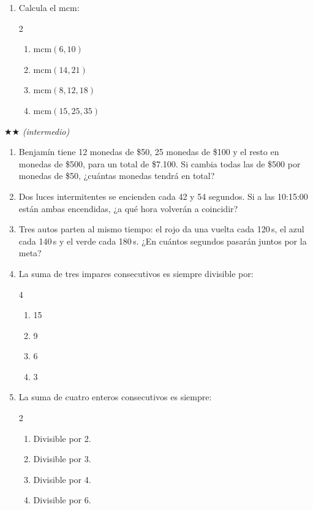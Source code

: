 \documentclass[11pt, letterpaper]{article}
\begin{document}
\begin{enumerate}[label=\textbf{\arabic*.}, leftmargin=*]
  \item Calcula el mcm:
  \begin{multicols}{2}
  \begin{enumerate}[label=\alph*)]
    \item $\text{mcm}(6,10)$
    \item $\text{mcm}(14,21)$
    \item $\text{mcm}(8,12,18)$
    \item $\text{mcm}(15,25,35)$
  \end{enumerate}
  \end{multicols}
\end{enumerate}

$\bigstar\bigstar$ \textit{(intermedio)}

\begin{enumerate}[label=\textbf{\arabic*.}, leftmargin=*, resume]
  \item Benjam\'in tiene 12 monedas de \$50, 25 monedas de \$100 y el resto en monedas de \$500, para un total de \$7.100. Si cambia todas las de \$500 por monedas de \$50, ¿cu\'antas monedas tendr\'a en total?

  \item Dos luces intermitentes se encienden cada 42 y 54 segundos. Si a las 10:15:00 est\'an ambas encendidas, ¿a qu\'e hora volver\'an a coincidir?

  \item Tres autos parten al mismo tiempo: el rojo da una vuelta cada 120\,s, el azul cada 140\,s y el verde cada 180\,s. ¿En cu\'antos segundos pasar\'an juntos por la meta?

  \item La suma de tres impares consecutivos es siempre divisible por:
  \begin{multicols}{4}
  \begin{enumerate}[label=\Alph*)]
    \item 15
    \item 9
    \item 6
    \item 3
  \end{enumerate}
  \end{multicols}

  \item La suma de cuatro enteros consecutivos es siempre:
  \begin{multicols}{2}
  \begin{enumerate}[label=\Alph*)]
    \item Divisible por 2.
    \item Divisible por 3.
    \item Divisible por 4.
    \item Divisible por 6.
  \end{enumerate}
  \end{multicols}
\end{enumerate}
\end{document}
